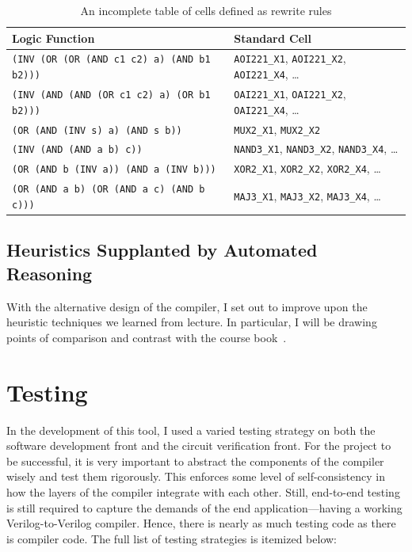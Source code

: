 \documentclass[10pt,letterpaper]{article}
\begin{document}
\begin{table}[h]
    \centering
    \begin{tabular}{ll}
        \toprule
        \textbf{Logic Function}                            & \textbf{Standard Cell}                                                \\ \midrule
        \texttt{(INV (OR (OR (AND c1 c2) a) (AND b1 b2)))} & \texttt{AOI221\_X1}, \texttt{AOI221\_X2}, \texttt{AOI221\_X4}, \ldots \\
        \texttt{(INV (AND (AND (OR c1 c2) a) (OR b1 b2)))} & \texttt{OAI221\_X1}, \texttt{OAI221\_X2}, \texttt{OAI221\_X4}, \ldots \\
        \texttt{(OR (AND (INV s) a) (AND s b))}            & \texttt{MUX2\_X1}, \texttt{MUX2\_X2}                                  \\
        \texttt{(INV (AND (AND a b) c))}                   & \texttt{NAND3\_X1}, \texttt{NAND3\_X2}, \texttt{NAND3\_X4}, \ldots    \\
        \texttt{(OR (AND b (INV a)) (AND a (INV b)))}      & \texttt{XOR2\_X1}, \texttt{XOR2\_X2}, \texttt{XOR2\_X4}, \ldots       \\
        \texttt{(OR (AND a b) (OR (AND a c) (AND b c)))}   & \texttt{MAJ3\_X1}, \texttt{MAJ3\_X2}, \texttt{MAJ3\_X4}, \ldots       \\
        \bottomrule
    \end{tabular}
    \caption{An incomplete table of cells defined as rewrite rules}\label{tab:morecells}
\end{table}

\subsection{Heuristics Supplanted by Automated Reasoning}\label{sec:alt:heuristics}

With the alternative design of the compiler, I set out to improve upon the
heuristic techniques we learned from lecture. In particular, I will be drawing
points of comparison and contrast with the course book~\cite{coursebook}.

\section{Testing}\label{sec:testing}

In the development of this tool, I used a varied testing strategy on both the
software development front and the circuit verification front. For the project
to be successful, it is very important to abstract the components of the
compiler wisely and test them rigorously. This enforces some level of
self-consistency in how the layers of the compiler integrate with each other.
Still, end-to-end testing is still required to capture the demands of the end
application---having a working Verilog-to-Verilog compiler. Hence, there is
nearly as much testing code as there is compiler code. The full list of testing
strategies is itemized below:
\end{document}

